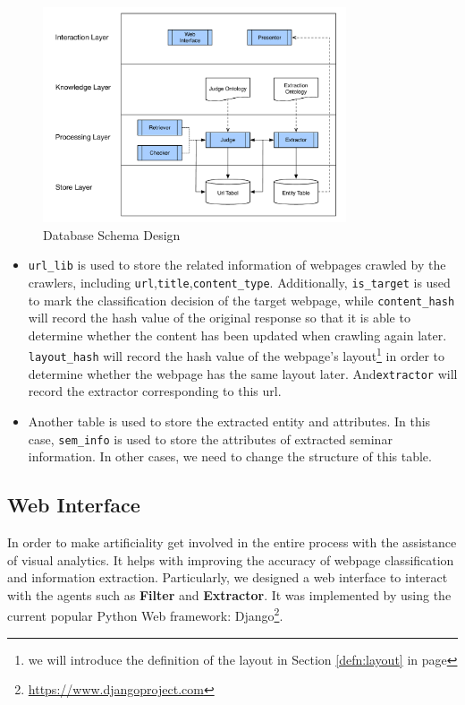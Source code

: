 \begin{figure}[htb]
	\centering
	\includegraphics[page=9,width=0.8\textwidth]{images/diagrams.pdf}
	\caption{Database Schema Design}\label{fig:sys:db}
\end{figure}
\begin{itemize}
	\item \texttt{url\_lib} is used to store the related information of webpages crawled by the crawlers, including \texttt{url},\texttt{title},\texttt{content\_type}. Additionally, \texttt{is\_target} is used to mark the classification decision of the target webpage, while \texttt{content\_hash} will record the hash value of the original response so that it is able to determine whether the content has been updated when crawling again later. \texttt{layout\_hash} will record the hash value of the webpage's layout\footnote{we will introduce the definition of the layout in Section \ref{defn:layout} in page \pageref{defn:layout} } in order to determine whether the webpage has the same layout later. And\texttt{extractor} will record the extractor corresponding to this url.
	\item Another table is used to store the extracted entity and attributes. In this case, \texttt{sem\_info} is used to store the attributes of extracted seminar information. In other cases, we need to change the structure of this table.
\end{itemize}

\subsection{Web Interface}
In order to make artificiality get involved in the entire process with the assistance of visual analytics. It helps with improving the accuracy of webpage classification and information extraction. Particularly, we designed a web interface to interact with the agents such as \textbf{Filter} and \textbf{Extractor}. It was implemented by using the current popular Python Web framework: Django\footnote{\url{https://www.djangoproject.com}
}.

